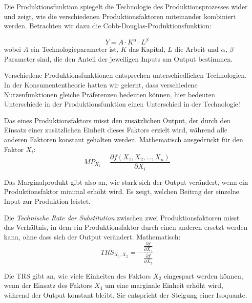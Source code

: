 \begin{example}
	Die Produktionsfunktion spiegelt die Technologie des Produktionsprozesses wider und zeigt, wie die verschiedenen Produktionsfaktoren miteinander kombiniert werden.
	Betrachten wir dazu die Cobb-Douglas-Produktionsfunktion:

	\[
		Y = A \cdot K^\alpha \cdot L^\beta
	\]
	wobei \( A \) ein Technologieparameter ist, \( K \) das Kapital, \( L \) die Arbeit und \( \alpha \), \( \beta \) Parameter sind, die den Anteil der jeweiligen Inputs am Output bestimmen.

\end{example}
\begin{remark}
	Verschiedene Produktionsfunktionen entsprechen unterschiedlichen Technologien. In der Konsumententheorie hatten wir gelernt, dass verschiedene Nutzenfunktionen gleiche Präferenzen bedeuten können, hier bedeuten Unterschiede in der Produktionsfunktion einen Unterschied in der Technologie!
\end{remark}

\begin{definition} 
	Das  eines Produktionsfaktors misst den zusätzlichen Output, der durch den Einsatz einer zusätzlichen Einheit dieses Faktors erzielt wird, während alle anderen Faktoren konstant gehalten werden.
	Mathematisch ausgedrückt für den Faktor \( X_i \):
	\[
		MP_{X_i} = \frac{\partial f(X_1, X_2, \dots, X_n)}{\partial X_i}
	\]

\end{definition}
Das Marginalprodukt gibt also an, wie stark sich der Output verändert, wenn ein Produktionsfaktor minimal erhöht wird. Es zeigt, welchen Beitrag der einzelne Input zur Produktion leistet.

\begin{definition}
	Die \textit{Technische Rate der Substitution} zwischen zwei Produktionsfaktoren misst das Verhältnis, in dem ein Produktionsfaktor durch einen anderen ersetzt werden kann, ohne dass sich der Output verändert.
	Mathematisch:
	\[
		TRS_{X_1, X_2} = - \frac{\frac{\partial f}{\partial X_1}}{\frac{\partial f}{\partial X_2}}
	\]
\end{definition}

Die TRS gibt an, wie viele Einheiten des Faktors \( X_2 \) eingespart werden können, wenn der Einsatz des Faktors \( X_1 \) um eine marginale Einheit erhöht wird, während der Output konstant bleibt. Sie entspricht der Steigung einer Isoquante.

